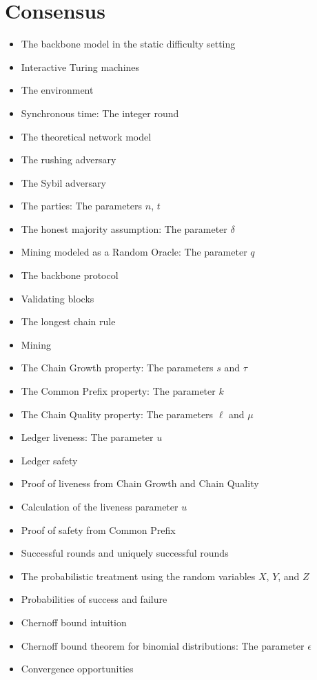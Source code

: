 \chapter{Consensus}

{\color{red}
\begin{itemize}
\item The backbone model in the static difficulty setting
\item Interactive Turing machines
\item The environment
\item Synchronous time: The integer round
\item The theoretical network model
\item The rushing adversary
\item The Sybil adversary
\item The parties: The parameters $n$, $t$
\item The honest majority assumption: The parameter $\delta$
\item Mining modeled as a Random Oracle: The parameter $q$
\item The backbone protocol
\item Validating blocks
\item The longest chain rule
\item Mining
\item The Chain Growth property: The parameters $s$ and $\tau$
\item The Common Prefix property: The parameter $k$
\item The Chain Quality property: The parameters $\ell$ and $\mu$
\item Ledger liveness: The parameter $u$
\item Ledger safety
\item Proof of liveness from Chain Growth and Chain Quality
\item Calculation of the liveness parameter $u$
\item Proof of safety from Common Prefix
\item Successful rounds and uniquely successful rounds
\item The probabilistic treatment using the random variables $X$, $Y$, and $Z$
\item Probabilities of success and failure
\item Chernoff bound intuition
\item Chernoff bound theorem for binomial distributions: The parameter $\epsilon$
\item Convergence opportunities

\end{itemize}}
